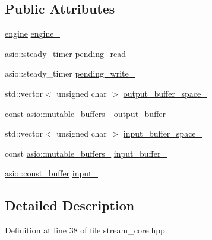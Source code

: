 \subsection*{Public Attributes}
\begin{DoxyCompactItemize}
\item 
\hyperlink{classasio_1_1ssl_1_1detail_1_1engine}{engine} \hyperlink{structasio_1_1ssl_1_1detail_1_1stream__core_a9dea6ab1e3ef81c33a81a33f5132677e}{engine\+\_\+}
\item 
asio\+::steady\+\_\+timer \hyperlink{structasio_1_1ssl_1_1detail_1_1stream__core_a08b94b7de2721f0626661c5961763839}{pending\+\_\+read\+\_\+}
\item 
asio\+::steady\+\_\+timer \hyperlink{structasio_1_1ssl_1_1detail_1_1stream__core_a98ba1a9b9f73132718a94a124f76ad63}{pending\+\_\+write\+\_\+}
\item 
std\+::vector$<$ unsigned char $>$ \hyperlink{structasio_1_1ssl_1_1detail_1_1stream__core_a83e532493488c0634ce810b55ff69dc5}{output\+\_\+buffer\+\_\+space\+\_\+}
\item 
const \hyperlink{classasio_1_1mutable__buffers__1}{asio\+::mutable\+\_\+buffers\+\_} \hyperlink{structasio_1_1ssl_1_1detail_1_1stream__core_af659b52dd531c1d4434a77a3dad4b5d6}{output\+\_\+buffer\+\_\+}
\item 
std\+::vector$<$ unsigned char $>$ \hyperlink{structasio_1_1ssl_1_1detail_1_1stream__core_af21606076df39a3a112f72b2179ee2ac}{input\+\_\+buffer\+\_\+space\+\_\+}
\item 
const \hyperlink{classasio_1_1mutable__buffers__1}{asio\+::mutable\+\_\+buffers\+\_} \hyperlink{structasio_1_1ssl_1_1detail_1_1stream__core_ad51277563d8b30a11995c413ca88efa1}{input\+\_\+buffer\+\_\+}
\item 
\hyperlink{classasio_1_1const__buffer}{asio\+::const\+\_\+buffer} \hyperlink{structasio_1_1ssl_1_1detail_1_1stream__core_a56d978014adae3ce8f51052c7b60b4b6}{input\+\_\+}
\end{DoxyCompactItemize}


\subsection{Detailed Description}


Definition at line 38 of file stream\+\_\+core.\+hpp.



